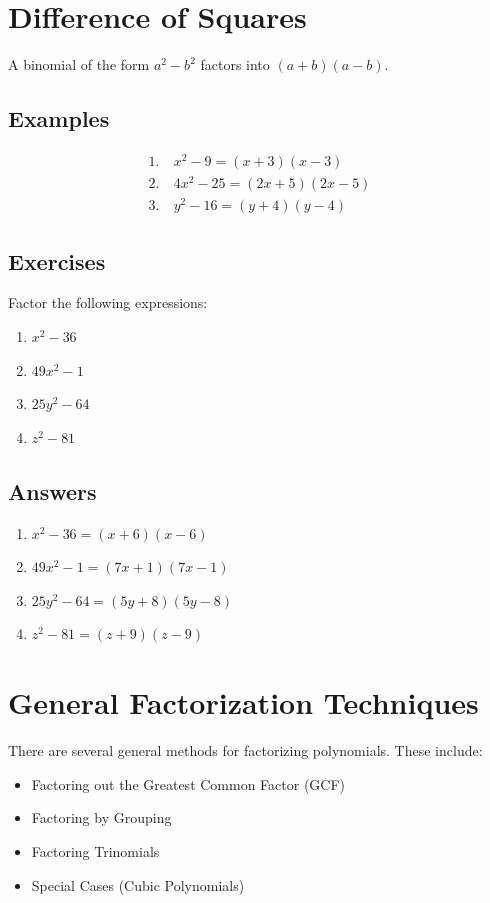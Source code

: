 \documentclass[12pt]{article}
\begin{document}
\section*{Difference of Squares}
A binomial of the form $a^2 - b^2$ factors into $(a+b)(a-b)$.

\subsection*{Examples}
\begin{align*}
1.\ & x^2 - 9 = (x+3)(x-3) \\
2.\ & 4x^2 - 25 = (2x+5)(2x-5) \\
3.\ & y^2 - 16 = (y+4)(y-4)
\end{align*}

\subsection*{Exercises}
Factor the following expressions:
\begin{multicols}{2}
\begin{enumerate}
    \item $x^2 - 36$
    \item $49x^2 - 1$
    \item $25y^2 - 64$
    \item $z^2 - 81$
\end{enumerate}
\end{multicols}

\subsection*{Answers}
\begin{multicols}{2}
\begin{enumerate}
\item $x^2 - 36 = (x+6)(x-6)$
\item $49x^2 - 1 = (7x+1)(7x-1)$
\item $25y^2 - 64 = (5y+8)(5y-8)$
\item $z^2 - 81 = (z+9)(z-9)$
\end{enumerate}
\end{multicols}

\newpage
\section*{General Factorization Techniques}
There are several general methods for factorizing polynomials. These include:
\begin{itemize}
    \item Factoring out the Greatest Common Factor (GCF)
    \item Factoring by Grouping
    \item Factoring Trinomials
    \item Special Cases (Cubic Polynomials)
\end{itemize}
\end{document}
